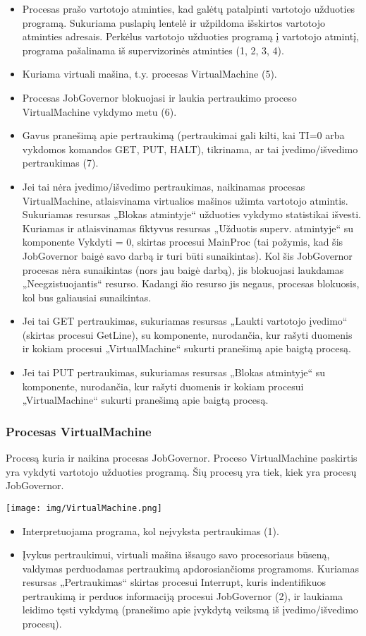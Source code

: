 	\begin{itemize}
		\item Procesas prašo vartotojo atminties, kad galėtų patalpinti vartotojo užduoties programą. Sukuriama puslapių lentelė ir užpildoma išskirtos vartotojo atminties adresais. Perkėlus vartotojo užduoties programą į vartotojo atmintį, programa pašalinama iš supervizorinės atminties (1, 2, 3, 4). 
		\item Kuriama virtuali mašina, t.y. procesas VirtualMachine (5).
		\item Procesas JobGovernor blokuojasi ir laukia pertraukimo proceso VirtualMachine vykdymo metu (6).
		\item Gavus pranešimą apie pertraukimą (pertraukimai gali kilti, kai TI=0 arba vykdomos komandos GET, PUT, HALT), tikrinama, ar tai įvedimo/išvedimo pertraukimas (7).
		\item Jei tai nėra įvedimo/išvedimo pertraukimas, naikinamas procesas VirtualMachine, atlaisvinama virtualios mašinos užimta vartotojo atmintis. Sukuriamas resursas „Blokas atmintyje“ užduoties vykdymo statistikai išvesti. Kuriamas ir atlaisvinamas fiktyvus resursas „Užduotis superv. atmintyje“ su komponente Vykdyti = 0, skirtas procesui MainProc (tai požymis, kad šis JobGovernor baigė savo darbą ir turi būti sunaikintas). Kol šis JobGovernor procesas nėra sunaikintas (nors jau baigė darbą), jis blokuojasi laukdamas „Neegzistuojantis“ resurso. Kadangi šio resurso jis negaus, procesas blokuosis, kol bus galiausiai sunaikintas.
		\item Jei tai GET pertraukimas, sukuriamas resursas „Laukti vartotojo įvedimo“ (skirtas procesui GetLine), su komponente, nurodančia, kur rašyti duomenis ir kokiam procesui „VirtualMachine“ sukurti pranešimą apie baigtą procesą.
		\item Jei tai PUT pertraukimas, sukuriamas resursas „Blokas atmintyje“ su komponente, nurodančia, kur rašyti duomenis ir kokiam procesui „VirtualMachine“ sukurti pranešimą apie baigtą procesą.
	\end{itemize}
\subsubsection{Procesas VirtualMachine}
Procesą kuria ir naikina procesas JobGovernor. Proceso VirtualMachine paskirtis yra vykdyti vartotojo užduoties programą. Šių procesų yra tiek, kiek yra procesų JobGovernor.

\texttt{[image: img/VirtualMachine.png]}

	\begin{itemize}
		\item Interpretuojama programa, kol neįvyksta pertraukimas (1).
		\item Įvykus pertraukimui, virtuali mašina išsaugo savo procesoriaus būseną, valdymas perduodamas pertraukimą apdorosiančioms programoms. Kuriamas resursas „Pertraukimas“ skirtas procesui Interrupt, kuris indentifikuos pertraukimą ir perduos informaciją procesui JobGovernor (2), ir laukiama leidimo tęsti vykdymą (pranešimo apie įvykdytą veiksmą iš įvedimo/išvedimo procesų).
	\end{itemize}
